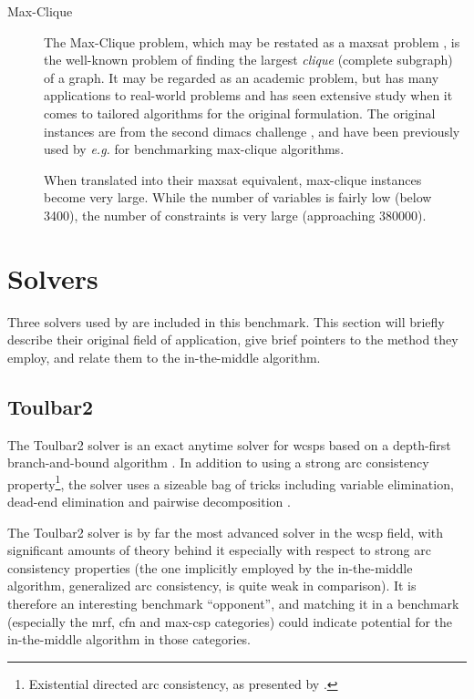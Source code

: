\begin{description}
	\item[Max-Clique]
		The Max-Clique problem, which may be restated as a \gls{maxsat} problem \parencite{Heras08}, is the well-known problem of finding the largest \emph{clique} (complete subgraph) of a graph.
		It may be regarded as an academic problem, but has many applications to real-world problems and has seen extensive study when it comes to tailored algorithms for the original formulation.
		The original instances are from the second \gls{dimacs} challenge \parencite{Johnson96}, and have been previously used by \emph{e.g.} \textcite{Östergård02} for benchmarking max-clique algorithms.

		When translated into their \gls{maxsat} equivalent, max-clique instances become very large. While the number of variables is fairly low (below \num{3400}), the number of constraints is very large (approaching \num{380000}).
\end{description}

\section{Solvers}
Three solvers used by \textcite{deGivry14} are included in this benchmark.
This section will briefly describe their original field of application, give brief pointers to the method they employ, and relate them to the in-the-middle algorithm.

\subsection{Toulbar2}
The Toulbar2 solver is an exact anytime solver for \glspl{wcsp} based on a depth-first branch-and-bound algorithm \parencite{Allouche10}.
In addition to using a strong arc consistency property\footnote{Existential directed arc consistency, as presented by \textcite{deGivry05}.}, the solver uses a sizeable bag of tricks including variable elimination, dead-end elimination \parencite{deGivry13} and pairwise decomposition \parencite{Favier11}.

The Toulbar2 solver is by far the most advanced solver in the \gls{wcsp} field, with significant amounts of theory behind it especially with respect to strong arc consistency properties (the one implicitly employed by the in-the-middle algorithm, generalized arc consistency, is quite weak in comparison).
It is therefore an interesting benchmark \enquote{opponent}, and matching it in a benchmark (especially the \gls{mrf}, \gls{cfn} and max-\gls{csp} categories) could indicate potential for the in-the-middle algorithm in those categories.

